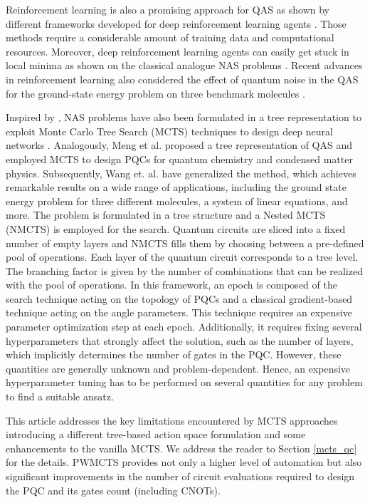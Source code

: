 Reinforcement learning is also a promising approach for QAS as shown by different frameworks developed for deep reinforcement learning agents \cite{niu2019universal, fosel2018reinforcement,  ostaszewski2021reinforcement, kuo2021quantum}. Those methods require a considerable amount of training data and computational resources. Moreover, deep reinforcement learning agents can easily get stuck in local minima as shown on the classical analogue NAS problems \cite{pham2018efficient}. Recent advances in reinforcement learning also considered the effect of quantum noise in the QAS for the ground-state energy problem on three benchmark molecules \cite{patel2024curriculum}.

Inspired by \cite{alphazero}, NAS problems have also been formulated in a tree representation to exploit Monte Carlo Tree Search (MCTS) techniques to design deep neural networks \cite{wang2020neural, huang2021neural}. Analogously, Meng et al. \cite{meng2021quantum} proposed a tree representation of QAS and employed MCTS to design PQCs for quantum chemistry and condensed matter physics. Subsequently, Wang et. al. \cite{wang} have generalized the method, which achieves remarkable results on a wide range of applications, including the ground state energy problem for three different molecules, a system of linear equations, and more.  The problem is formulated in a tree structure and a Nested MCTS (NMCTS) is employed for the search. Quantum circuits are sliced into a fixed number of empty layers and NMCTS fills them by choosing between a pre-defined pool of operations. Each layer of the quantum circuit corresponds to a tree level. The branching factor is given by the number of combinations that can be realized with the pool of operations. In this framework, an epoch is composed of the search technique acting on the topology of PQCs and a classical gradient-based technique acting on the angle parameters. This technique requires an expensive parameter optimization step at each epoch. Additionally, it requires fixing several hyperparameters that strongly affect the solution, such as the number of layers, which implicitly determines the number of gates in the PQC. However, these quantities are generally unknown and problem-dependent. Hence, an expensive hyperparameter tuning has to be performed on several quantities for any problem to find a suitable ansatz. 

This article addresses the key limitations encountered by MCTS approaches introducing a different tree-based action space formulation and some enhancements to the vanilla MCTS. We address the reader to Section \ref{mcts_qc} for the details. PWMCTS provides not only a higher level of automation but also significant improvements in the number of circuit evaluations required to design the PQC and its gates count (including CNOTs).